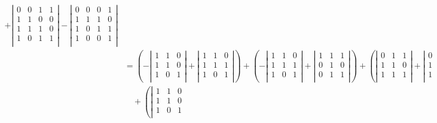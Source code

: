 \begin{loesung}
\begin{align*}
%
+\left|\begin{matrix}
0&0&1&1\\
1&1&0&0\\
1&1&1&0\\
1&0&1&1\\
\end{matrix}\right|
-\left|\begin{matrix}
0&0&0&1\\
1&1&1&0\\
1&0&1&1\\
1&0&0&1\\
\end{matrix}\right|
\\
&=
\left(
-\left|\begin{matrix}
1&1&0\\
1&1&0\\
1&0&1\\
\end{matrix}\right|
+\left|\begin{matrix}
1&1&0\\
1&1&1\\
1&0&1\\
\end{matrix}\right|
\right)
%
+
\left(
-\left|\begin{matrix}
1&1&0\\
1&1&1\\
1&0&1\\
\end{matrix}\right|
%
+\left|\begin{matrix}
1&1&1\\
0&1&0\\
0&1&1\\
\end{matrix}\right|
\right)
%
+
\left(
\left|\begin{matrix}
0&1&1\\
1&1&0\\
1&1&1\\
\end{matrix}\right|
+\left|\begin{matrix}
0&1&1\\
1&0&1\\
1&0&1\\
\end{matrix}\right|
\right)
\\
&
\quad
+
\left(
\left|\begin{matrix}
1&1&0\\
1&1&0\\
1&0&1\\

\end{matrix}
\end{align*}
\end{loesung}
